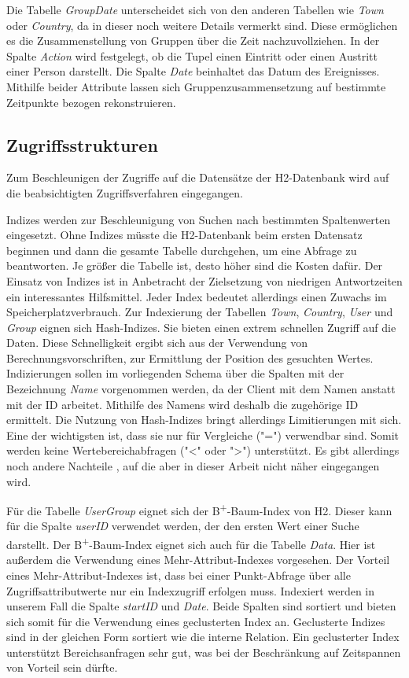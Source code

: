 Die Tabelle \textit{GroupDate} unterscheidet sich von den anderen Tabellen wie \textit{Town} oder \textit{Country}, da in dieser noch weitere Details vermerkt sind. Diese ermöglichen es die Zusammenstellung von Gruppen über die Zeit nachzuvollziehen. In der Spalte \textit{Action} wird festgelegt, ob die Tupel einen Eintritt oder einen Austritt einer Person darstellt. Die Spalte \textit{Date} beinhaltet das Datum des Ereignisses. Mithilfe beider Attribute lassen sich Gruppenzusammensetzung auf bestimmte Zeitpunkte bezogen rekonstruieren.

\subsection{Zugriffsstrukturen}

Zum Beschleunigen der Zugriffe auf die Datensätze der H2-Datenbank wird auf die beabsichtigten Zugriffsverfahren eingegangen. 

Indizes werden zur Beschleunigung von Suchen nach bestimmten Spaltenwerten eingesetzt. Ohne Indizes müsste die H2-Datenbank beim ersten Datensatz beginnen und dann die gesamte Tabelle durchgehen, um eine Abfrage zu beantworten. Je größer die Tabelle ist, desto höher sind die Kosten dafür. Der Einsatz von Indizes ist in Anbetracht der Zielsetzung von niedrigen Antwortzeiten ein interessantes Hilfsmittel. Jeder Index bedeutet allerdings einen Zuwachs im Speicherplatzverbrauch. Zur Indexierung der Tabellen \textit{Town}, \textit{Country}, \textit{User} und \textit{Group} eignen sich Hash-Indizes. Sie bieten einen extrem schnellen Zugriff auf die Daten. Diese Schnelligkeit ergibt sich aus der Verwendung von Berechnungsvorschriften, zur Ermittlung der Position des gesuchten Wertes. Indizierungen sollen im vorliegenden Schema über die Spalten mit der Bezeichnung \textit{Name} vorgenommen werden, da der Client mit dem Namen anstatt mit der ID arbeitet. Mithilfe des Namens wird deshalb die zugehörige ID ermittelt. Die Nutzung von Hash-Indizes bringt allerdings Limitierungen mit sich. Eine der wichtigsten ist, dass sie nur für Vergleiche ("=") verwendbar sind. Somit werden keine Wertebereichabfragen ("<" oder ">") unterstützt. Es gibt allerdings noch andere Nachteile \cite{SWB-352401869}, auf die aber in dieser Arbeit nicht näher eingegangen wird. 

Für die Tabelle \textit{UserGroup} eignet sich der B\textsuperscript{+}-Baum-Index von H2. Dieser kann für die Spalte \textit{userID} verwendet werden, der den ersten Wert einer Suche darstellt. Der B\textsuperscript{+}-Baum-Index eignet sich auch für die Tabelle \textit{Data}. Hier ist außerdem die Verwendung eines Mehr-Attribut-Indexes vorgesehen. Der Vorteil eines Mehr-Attribut-Indexes ist, dass bei einer Punkt-Abfrage über alle Zugriffsattributwerte nur ein Indexzugriff erfolgen muss. Indexiert werden in unserem Fall die Spalte \textit{startID} und \textit{Date}. Beide Spalten sind sortiert und bieten sich somit für die Verwendung eines geclusterten Index an. Geclusterte Indizes sind in der gleichen Form sortiert wie die interne Relation. Ein geclusterter Index unterstützt Bereichsanfragen sehr gut, was bei der Beschränkung auf Zeitspannen von Vorteil sein dürfte.       


